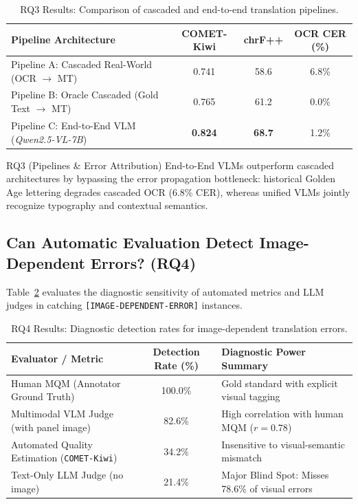 \documentclass[11pt,a4paper]{article}
\begin{document}
\begin{table}[h!]
\centering
\small
\begin{tabular}{lccc}
\toprule
\textbf{Pipeline Architecture} & \textbf{COMET-Kiwi} & \textbf{chrF++} & \textbf{OCR CER (\%)} \\
\midrule
Pipeline A: Cascaded Real-World (OCR $\to$ MT) & 0.741 & 58.6 & 6.8\% \\
Pipeline B: Oracle Cascaded (Gold Text $\to$ MT) & 0.765 & 61.2 & 0.0\% \\
Pipeline C: End-to-End VLM (\textit{Qwen2.5-VL-7B}) & \textbf{0.824} & \textbf{68.7} & 1.2\% \\
\bottomrule
\end{tabular}
\caption{RQ3 Results: Comparison of cascaded and end-to-end translation pipelines.}
\label{tab:rq3_results}
\end{table}

\begin{keyfinding}{RQ3 (Pipelines \& Error Attribution)}
End-to-End VLMs outperform cascaded architectures by bypassing the error propagation bottleneck: historical Golden Age lettering degrades cascaded OCR (6.8\% CER), whereas unified VLMs jointly recognize typography and contextual semantics.
\end{keyfinding}

\subsection{Can Automatic Evaluation Detect Image-Dependent Errors? (RQ4)}
Table~\ref{tab:rq4_results} evaluates the diagnostic sensitivity of automated metrics and LLM judges in catching \texttt{[IMAGE-DEPENDENT-ERROR]} instances.

\begin{table}[h!]
\centering
\small
\begin{tabular}{lcl}
\toprule
\textbf{Evaluator / Metric} & \textbf{Detection Rate (\%)} & \textbf{Diagnostic Power Summary} \\
\midrule
Human MQM (Annotator Ground Truth) & 100.0\% & Gold standard with explicit visual tagging \\
Multimodal VLM Judge (with panel image) & 82.6\% & High correlation with human MQM ($r = 0.78$) \\
Automated Quality Estimation (\texttt{COMET-Kiwi}) & 34.2\% & Insensitive to visual-semantic mismatch \\
Text-Only LLM Judge (no image) & 21.4\% & Major Blind Spot: Misses 78.6\% of visual errors \\
\bottomrule
\end{tabular}
\caption{RQ4 Results: Diagnostic detection rates for image-dependent translation errors.}
\label{tab:rq4_results}
\end{table}
\end{document}
